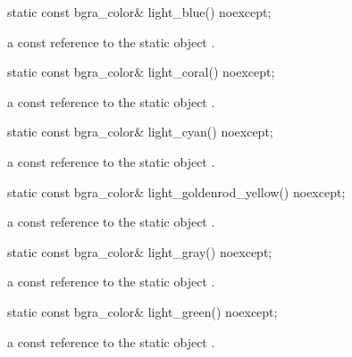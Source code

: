 \begin{itemdecl}
static const bgra_color& light_blue() noexcept;
\end{itemdecl}
\begin{itemdescr}
\pnum
\returns
a const reference to the static  object .
\end{itemdescr}

\begin{itemdecl}
static const bgra_color& light_coral() noexcept;
\end{itemdecl}
\begin{itemdescr}
\pnum
\returns
a const reference to the static  object .
\end{itemdescr}

\begin{itemdecl}
static const bgra_color& light_cyan() noexcept;
\end{itemdecl}
\begin{itemdescr}
\pnum
\returns
a const reference to the static  object .
\end{itemdescr}

\begin{itemdecl}
static const bgra_color& light_goldenrod_yellow() noexcept;
\end{itemdecl}
\begin{itemdescr}
\pnum
\returns
a const reference to the static  object .
\end{itemdescr}

\begin{itemdecl}
static const bgra_color& light_gray() noexcept;
\end{itemdecl}
\begin{itemdescr}
\pnum
\returns
a const reference to the static  object .
\end{itemdescr}

\begin{itemdecl}
static const bgra_color& light_green() noexcept;
\end{itemdecl}
\begin{itemdescr}
\pnum
\returns
a const reference to the static  object .
\end{itemdescr}

